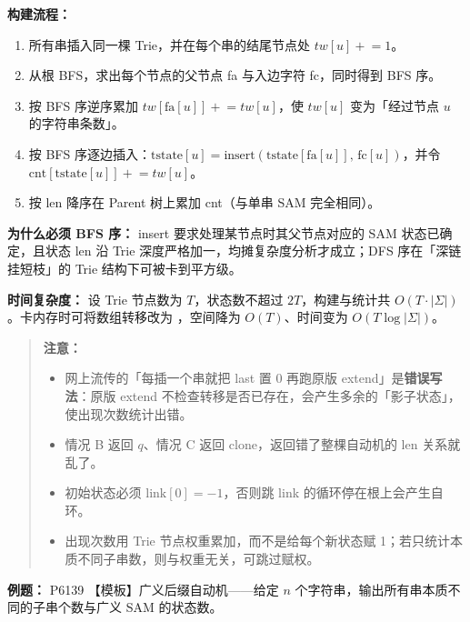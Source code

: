 \textbf{构建流程：}
\begin{enumerate}
  \item 所有串插入同一棵 Trie，并在每个串的结尾节点处 $tw[u] \mathrel{+}= 1$。
  \item 从根 BFS，求出每个节点的父节点 fa 与入边字符 fc，同时得到 BFS 序。
  \item 按 BFS 序逆序累加 $tw[\text{fa}[u]] \mathrel{+}= tw[u]$，使 $tw[u]$ 变为「经过节点 $u$ 的字符串条数」。
  \item 按 BFS 序逐边插入：$\text{tstate}[u] = \text{insert}(\text{tstate}[\text{fa}[u]],\, \text{fc}[u])$，并令 $\text{cnt}[\text{tstate}[u]] \mathrel{+}= tw[u]$。
  \item 按 len 降序在 Parent 树上累加 cnt（与单串 SAM 完全相同）。
\end{enumerate}

\textbf{为什么必须 BFS 序：} insert 要求处理某节点时其父节点对应的 SAM 状态已确定，且状态 len 沿 Trie 深度严格加一，均摊复杂度分析才成立；DFS 序在「深链挂短枝」的 Trie 结构下可被卡到平方级。

\textbf{时间复杂度：} 设 Trie 节点数为 $T$，状态数不超过 $2T$，构建与统计共 $O(T \cdot |\Sigma|)$。卡内存时可将数组转移改为 ，空间降为 $O(T)$、时间变为 $O(T \log |\Sigma|)$。

\begin{quote}
\textbf{注意：}
\begin{itemize}
  \item 网上流传的「每插一个串就把 last 置 0 再跑原版 extend」是\textbf{错误写法}：原版 extend 不检查转移是否已存在，会产生多余的「影子状态」，使出现次数统计出错。
  \item 情况 B 返回 $q$、情况 C 返回 clone，返回错了整棵自动机的 len 关系就乱了。
  \item 初始状态必须 $\text{link}[0] = -1$，否则跳 link 的循环停在根上会产生自环。
  \item 出现次数用 Trie 节点权重累加，而不是给每个新状态赋 1；若只统计本质不同子串数，则与权重无关，可跳过赋权。
\end{itemize}
\end{quote}

\textbf{例题：} P6139 【模板】广义后缀自动机——给定 $n$ 个字符串，输出所有串本质不同的子串个数与广义 SAM 的状态数。


